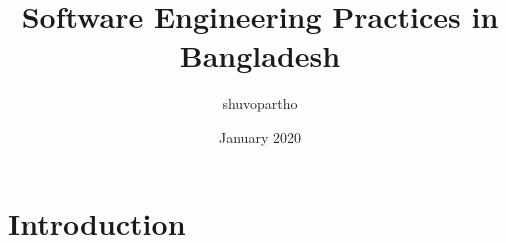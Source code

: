 \documentclass{article}
\title{Software Engineering Practices in Bangladesh}
\author{shuvopartho }
\date{January 2020}
\begin{document}
\maketitle

\section{Introduction}
\end{document}
